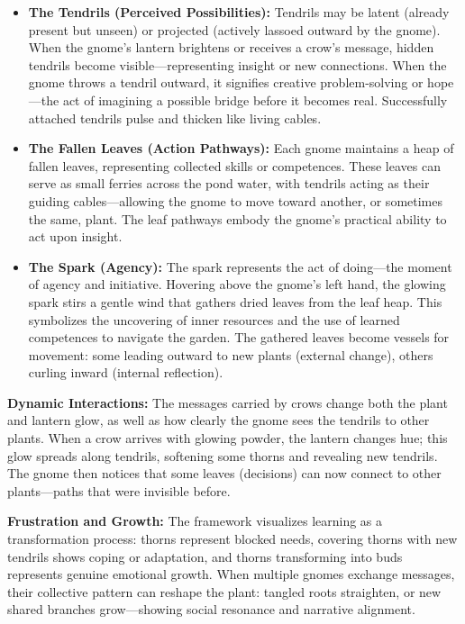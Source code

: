 \documentclass{article}
\begin{document}
\begin{itemize}[noitemsep,topsep=0pt]
    \item \textbf{The Tendrils (Perceived Possibilities):}  
    Tendrils may be latent (already present but unseen) or projected (actively lassoed outward by the gnome). When the gnome’s lantern brightens or receives a crow’s message, hidden tendrils become visible—representing insight or new connections. When the gnome throws a tendril outward, it signifies creative problem-solving or hope—the act of imagining a possible bridge before it becomes real. Successfully attached tendrils pulse and thicken like living cables.

    \item \textbf{The Fallen Leaves (Action Pathways):}  
    Each gnome maintains a heap of fallen leaves, representing collected skills or competences. These leaves can serve as small ferries across the pond water, with tendrils acting as their guiding cables—allowing the gnome to move toward another, or sometimes the same, plant. The leaf pathways embody the gnome’s practical ability to act upon insight.

    \item \textbf{The Spark (Agency):}  
    The spark represents the act of doing—the moment of agency and initiative. Hovering above the gnome’s left hand, the glowing spark stirs a gentle wind that gathers dried leaves from the leaf heap. This symbolizes the uncovering of inner resources and the use of learned competences to navigate the garden. The gathered leaves become vessels for movement: some leading outward to new plants (external change), others curling inward (internal reflection).

\end{itemize}


\textbf{Dynamic Interactions:} The messages carried by crows change both the plant and lantern glow, as well as how clearly the gnome sees the tendrils to other plants. When a crow arrives with glowing powder, the lantern changes hue; this glow spreads along tendrils, softening some thorns and revealing new tendrils. The gnome then notices that some leaves (decisions) can now connect to other plants—paths that were invisible before.

\textbf{Frustration and Growth:} The framework visualizes learning as a transformation process: thorns represent blocked needs, covering thorns with new tendrils shows coping or adaptation, and thorns transforming into buds represents genuine emotional growth. When multiple gnomes exchange messages, their collective pattern can reshape the plant: tangled roots straighten, or new shared branches grow—showing social resonance and narrative alignment.
\end{document}
